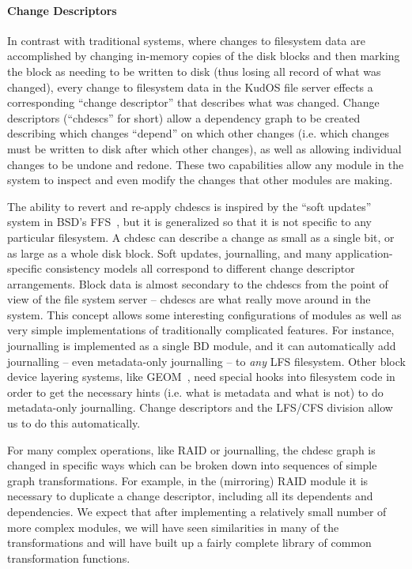 \paragraph{Change Descriptors}
\label{sec:chdescs}

In contrast with traditional systems, where changes to filesystem data are
accomplished by changing in-memory copies of the disk blocks and then marking
the block as needing to be written to disk (thus losing all record of what was
changed), every change to filesystem data in the KudOS file server effects a
corresponding ``change descriptor'' that describes what was changed. Change
descriptors (``chdescs'' for short) allow a dependency graph to be created
describing which changes ``depend'' on which other changes (i.e. which changes
must be written to disk after which other changes), as well as allowing
individual changes to be undone and redone. These two capabilities allow any
module in the system to inspect and even modify the changes that other modules
are making.

The ability to revert and re-apply chdescs is inspired by the ``soft updates''
system in BSD's FFS~\cite{ganger00soft}, but it is generalized so that it is not
specific to any particular filesystem. A chdesc can describe a change as small
as a single bit, or as large as a whole disk block. Soft updates, journalling,
and many application-specific consistency models all correspond to different
change descriptor arrangements. Block data is almost secondary to the chdescs
from the point of view of the file system server -- chdescs are what really move
around in the system. This concept allows some interesting configurations of
modules as well as very simple implementations of traditionally complicated
features. For instance, journalling is implemented as a single BD module, and it
can automatically add journalling -- even metadata-only journalling -- to {\it
any} LFS filesystem. Other block device layering systems, like GEOM~\cite{geom},
need special hooks into filesystem code in order to get the necessary hints
(i.e. what is metadata and what is not) to do metadata-only journalling.
 Change descriptors and the LFS/CFS division allow us to
do this automatically.

For many complex operations, like RAID or journalling, the chdesc graph is
changed in specific ways which can be broken down into sequences of simple graph
transformations. For example, in the (mirroring) RAID module it is necessary to
duplicate a change descriptor, including all its dependents and dependencies. We
expect that after implementing a relatively small number of more complex
modules, we will have seen similarities in many of the transformations and will
have built up a fairly complete library of common transformation functions.
